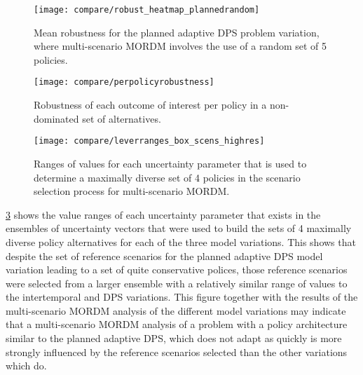     \begin{figure}[H]
        \centering
        \captionsetup{width=0.85\textwidth}
        
        \texttt{[image: compare/robust\_heatmap\_plannedrandom]}
        \caption[Mean robustness for planned adaptive variation given random reference scenario selection]{Mean robustness for the planned adaptive DPS problem variation, where multi-scenario MORDM involves the use of a random set of 5 policies.}
        \label{fig:robust-heatmap-planned-random}
    \end{figure}

    \begin{figure}[H]
        \centering
        \captionsetup{width=\textwidth}
        
        \texttt{[image: compare/perpolicyrobustness]}
        \caption{Robustness of each outcome of interest per policy in a non-dominated set of alternatives.}
        \label{fig:perpolicy-robustness}
    \end{figure}

    \begin{figure}[H]
        \centering
        \captionsetup{width=\textwidth}
        
        \texttt{[image: compare/leverranges\_box\_scens\_highres]}
        \caption[Uncertainty value ranges used to select reference scenarios for multi-scenario MORDM]{Ranges of values for each uncertainty parameter that is used to determine a maximally diverse set of 4 policies in the scenario selection process for multi-scenario MORDM.}
        \label{fig:scenarioselect-ranges}
    \end{figure}

    \cref{fig:scenarioselect-ranges} shows the value ranges of each uncertainty parameter that exists in the ensembles of uncertainty vectors that were used to build the sets of 4 maximally diverse policy alternatives for each of the three model variations. This shows that despite the set of reference scenarios for the planned adaptive DPS model variation leading to a set of quite conservative polices, those reference scenarios were selected from a larger ensemble with a relatively similar range of values to the intertemporal and DPS variations. This figure together with the results of the multi-scenario MORDM analysis of the different model variations may indicate that a multi-scenario MORDM analysis of a problem with a policy architecture similar to the planned adaptive DPS, which does not adapt as quickly is more strongly influenced by the reference scenarios selected than the other variations which do. 
    
